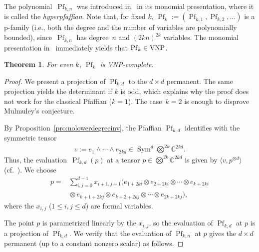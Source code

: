\documentclass[10pt,a4paper]{article}
\newtheorem{theorem}{Theorem}
\newcommand{\C}{\mathbb C}
\newcommand{\Sym}{\operatorname{Sym}}
\newcommand{\tensor}{\textstyle\bigotimes}
\DeclareMathOperator{\Pf}{Pf}
\newcommand{\VNP}{\textup{VNP}}
\begin{document}
%
%

%
%
%
%
%
%
%
%
%
%
%
%
%

%
%
%
%
%
%

\noindent
The polynomial~$\Pf_{k,n}$ was introduced in~\cite[Def.~3.4]{Bar:95} in its monomial presentation, where it is called the \emph{hyperpfaffian}.
Note that, for fixed $k$, $\Pf_k := (\Pf_{k,1},\Pf_{k,2},\dots)$ is a p-family (i.e., both the degree and the number of variables are polynomially bounded), since~$\Pf_{k,n}$ has degree~$n$ and $(2kn)^{2k}$ variables.
The monomial presentation in~\cite{Bar:95} immediately yields that $\Pf_k \in \VNP$.
\begin{theorem}
For even $k$, $\Pf_k$ is \VNP-complete.
\end{theorem}
\begin{proof}
We present a projection of $\Pf_{k,d}$ to the $d\times d$ permanent.
The same projection yields the determinant if $k$ is odd, which explains why the proof does not work for the classical Pfaffian ($k=1$).
The case~$k=2$ is enough to disprove Mulmuley's conjecture.

By Proposition~\ref{pro:nolowerdegreeinv}, the Pfaffian $\Pf_{k,d}$ identifies with the symmetric tensor
\begin{align*}
  v := e_1 \wedge \cdots \wedge e_{2kd} \in \Sym^d \tensor^{2k}\C^{2kd}.
\end{align*}
%
Thus, the evaluation~$\Pf_{k,d}(p)$ at a tensor $p \in \tensor^{2k} \C^{2kd}$ is given by $\langle v, p^{\otimes d}\rangle$ (cf.~\cite[Sec.~4.2(A)]{Ike:12}).
We choose
\[
\begin{aligned}
p ={}& \sum_{i,j=0}^{d-1} x_{i+1,j+1} (e_{1+2ki} \otimes e_{2+2ki} \otimes \cdots \otimes e_{k+2ki}\\
&{}\otimes e_{k+1+2kj} \otimes e_{k+2+2kj} \otimes \cdots \otimes e_{2k+2kj}),
\end{aligned}
\]
where the $x_{i,j}$ ($1 \leq i,j \leq d$) are formal variables.

The point $p$ is parametrized linearly by the $x_{i,j}$, so the evaluation of $\Pf_{k,d}$ at $p$ is a projection of $\Pf_{k,d}$.
We verify that the evaluation of $\Pf_{k,n}$ at $p$ gives the $d \times d$ permanent (up to a constant nonzero scalar) as follows.


\end{proof}
\end{document}
